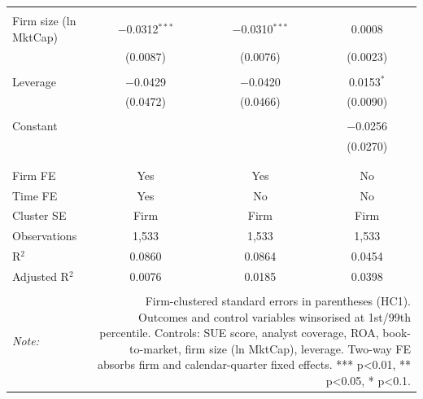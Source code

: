 \begin{table}[!htbp]
\begin{tabular}{@{\extracolsep{5pt}}lccc}
  & & & \\ 
 Firm size (ln MktCap) & $-$0.0312$^{***}$ & $-$0.0310$^{***}$ & 0.0008 \\ 
  & (0.0087) & (0.0076) & (0.0023) \\ 
  & & & \\ 
 Leverage & $-$0.0429 & $-$0.0420 & 0.0153$^{*}$ \\ 
  & (0.0472) & (0.0466) & (0.0090) \\ 
  & & & \\ 
 Constant &  &  & $-$0.0256 \\ 
  &  &  & (0.0270) \\ 
  & & & \\ 
\hline \\[-1.8ex] 
Firm FE & Yes & Yes & No \\ 
Time FE & Yes & No & No \\ 
Cluster SE & Firm & Firm & Firm \\ 
Observations & 1,533 & 1,533 & 1,533 \\ 
R$^{2}$ & 0.0860 & 0.0864 & 0.0454 \\ 
Adjusted R$^{2}$ & 0.0076 & 0.0185 & 0.0398 \\ 
\hline 
\hline \\[-1.8ex] 
\textit{Note:}  & \multicolumn{3}{r}{Firm-clustered standard errors in parentheses (HC1). Outcomes and control variables winsorised at 1st/99th percentile. Controls: SUE score, analyst coverage, ROA, book-to-market, firm size (ln MktCap), leverage. Two-way FE absorbs firm and calendar-quarter fixed effects. *** p<0.01, ** p<0.05, * p<0.1.} \\ 
\end{tabular} 
\end{table} 
